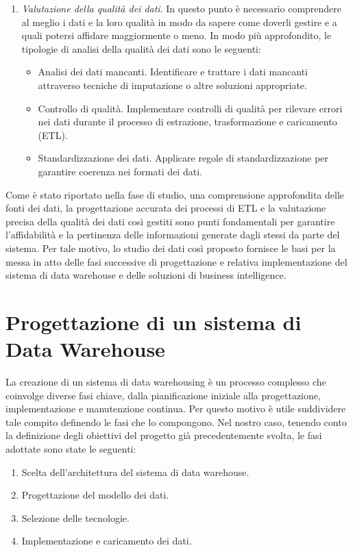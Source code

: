 \begin{enumerate}
\begin{itemize}
    \end{itemize}
    \item \textit{Valutazione della qualità dei dati}. In questo punto è necessario comprendere al meglio i dati e la loro qualità in modo da sapere come doverli gestire e a quali potersi affidare maggiormente o meno. In modo più approfondito, le tipologie di analisi della qualità dei dati sono le seguenti:
    \begin{itemize}
        \item Analisi dei dati mancanti. Identificare e trattare i dati mancanti attraverso tecniche di imputazione o altre soluzioni appropriate.
        \item Controllo di qualità. Implementare controlli di qualità per rilevare errori nei dati durante il processo di estrazione, trasformazione e caricamento (ETL).
        \item Standardizzazione dei dati. Applicare regole di standardizzazione per garantire coerenza nei formati dei dati.
    \end{itemize}
\end{enumerate}

Come è stato riportato nella fase di studio, una comprensione approfondita delle fonti dei dati, la progettazione accurata dei processi di ETL e la valutazione precisa della qualità dei dati così gestiti sono punti fondamentali per garantire l'affidabilità e la pertinenza delle informazioni generate dagli stessi da parte del sistema. Per tale motivo, lo studio dei dati così proposto fornisce le basi per la messa in atto delle fasi successive di progettazione e relativa implementazione del sistema di data warehouse e delle soluzioni di business intelligence.

\section{Progettazione di un sistema di Data Warehouse}

La creazione di un sistema di data warehousing è un processo complesso che coinvolge diverse fasi chiave, dalla pianificazione iniziale alla progettazione, implementazione e manutenzione continua. Per questo motivo è utile suddividere tale compito definendo le fasi che lo compongono. Nel nostro caso, tenendo conto la definizione degli obiettivi del progetto già precedentemente svolta, le fasi adottate sono state le seguenti:
\begin{enumerate}
    \item Scelta dell'architettura del sistema di data warehouse.
    \item Progettazione del modello dei dati.
    \item Selezione delle tecnologie.
    \item Implementazione e caricamento dei dati.
\end{enumerate}

